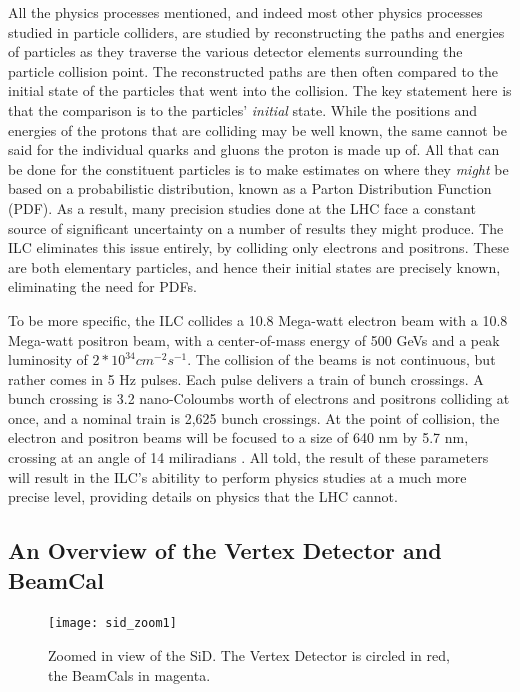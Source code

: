 \documentclass{report}
\begin{document}
                All the physics processes mentioned, and indeed most other physics processes studied in particle colliders, are studied by reconstructing the paths and energies of particles as they traverse the various detector elements surrounding the particle collision point. The reconstructed paths are then often compared to the initial state of the particles that went into the collision. The key statement here is that the comparison is to the particles' \textit{initial} state. While the positions and energies of the protons that are colliding may be well known, the same cannot be said for the individual quarks and gluons the proton is made up of. All that can be done for the constituent particles is to make estimates on where they \textit{might} be based on a probabilistic distribution, known as a Parton Distribution Function (PDF). As a result, many precision studies done at the LHC face a constant source of significant uncertainty on a number of results they might produce. The ILC eliminates this issue entirely, by colliding only electrons and positrons. These are both elementary particles, and hence their initial states are precisely known, eliminating the need for PDFs. 

                To be more specific, the ILC collides a 10.8 Mega-watt electron beam with a 10.8 Mega-watt positron beam, with a center-of-mass energy of 500 GeVs and a peak luminosity of $ 2 * 10^{34} cm^{-2}s^{-1} $. The collision of the beams is not continuous, but rather comes in 5 Hz pulses. Each pulse delivers a train of bunch crossings. A bunch crossing is 3.2 nano-Coloumbs worth of electrons and positrons colliding at once, and a nominal train is 2,625 bunch crossings. At the point of collision, the electron and positron beams will be focused to a size of 640 nm by 5.7 nm, crossing at an angle of 14 miliradians \cite{beam_specs}. All told, the result of these parameters will result in the ILC's abitility to perform physics studies at a much more precise level, providing details on physics that the LHC cannot.

            \subsection{An Overview of the Vertex Detector and BeamCal}
                \begin{figure}[h] 
                    \texttt{[image: sid\_zoom1]}
                    \centering
                    \caption{Zoomed in view of the SiD.
                        The Vertex Detector is circled in red,
                        the BeamCals in magenta.}
                    \label{fig__sid_zoom1}
                \end{figure}
\end{document}
